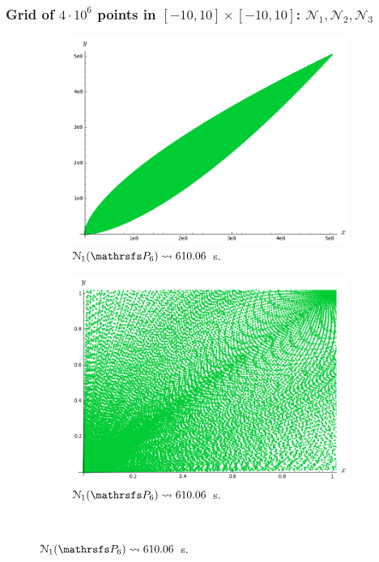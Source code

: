 \documentclass{beamer}
\begin{document}
\begin{frame}
\frametitle{Grid of $4\cdot 10^6$ points in $[-10, 10] \times [-10, 10]$: $\mathcal{N}_1, \mathcal{N}_2, \mathcal{N}_3$}

\begin{figure}
\vspace{-0.2cm}
\begin{subfigure}{.38\linewidth}\centering
\includegraphics[width=1\textwidth]{plots/ch5_new1_P6.png}
\vspace{-0.1cm}\caption{$\mathcal{N}_1(\PP_6)\leadsto 610.06$ s.}
\end{subfigure}
\hspace{0.8cm}
\begin{subfigure}{.38\linewidth}\centering
\includegraphics[width=1\textwidth]{plots/ch5_new1_P6prime.png}
\vspace{-0.1cm}\caption{$\mathcal{N}_1(\PP_6)\leadsto 610.06$ s.}
\end{subfigure}\\[1ex]


\end{figure}
\end{frame}
\end{document}
